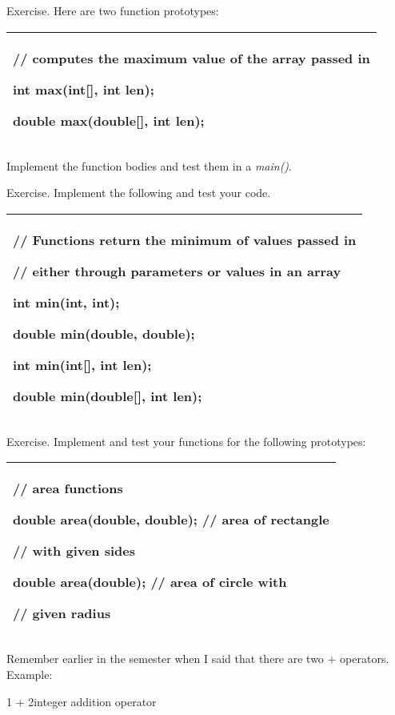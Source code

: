 \documentclass[
]{article}
\begin{document}
Exercise. Here are two function prototypes:

\begin{longtable}[]{@{}l@{}}
\toprule
\endhead
\begin{minipage}[t]{0.97\columnwidth}\raggedright
// computes the maximum value of the array passed in

int max(int{[}{]}, int len);

double max(double{[}{]}, int len);\strut
\end{minipage}\tabularnewline
\bottomrule
\end{longtable}

Implement the function bodies and test them in a \emph{main()}.

Exercise. Implement the following and test your code.

\begin{longtable}[]{@{}l@{}}
\toprule
\endhead
\begin{minipage}[t]{0.97\columnwidth}\raggedright
// Functions return the minimum of values passed in

// either through parameters or values in an array

int min(int, int);

double min(double, double);

int min(int{[}{]}, int len);

double min(double{[}{]}, int len);\strut
\end{minipage}\tabularnewline
\bottomrule
\end{longtable}

Exercise. Implement and test your functions for the following
prototypes:

\begin{longtable}[]{@{}l@{}}
\toprule
\endhead
\begin{minipage}[t]{0.97\columnwidth}\raggedright
// area functions

double area(double, double); // area of rectangle

// with given sides

double area(double); // area of circle with

// given radius\strut
\end{minipage}\tabularnewline
\bottomrule
\end{longtable}

Remember earlier in the semester when I said that there are two +
operators. Example:

1 + 2integer addition operator
\end{document}
